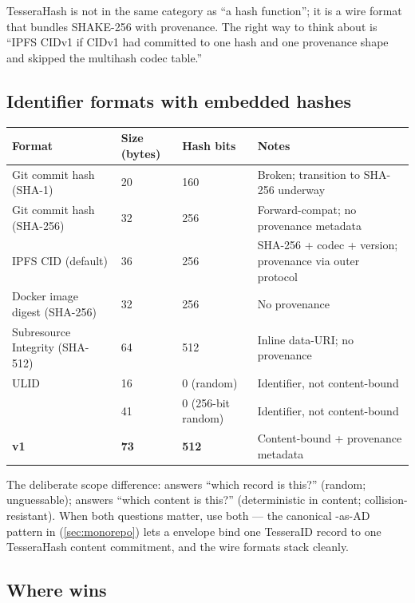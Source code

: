 TesseraHash is not in the same category as ``a hash function''; it is a wire format that bundles SHAKE-256 with provenance. The right way to think about \tesserahash{} is ``IPFS CIDv1 if CIDv1 had committed to one hash and one provenance shape and skipped the multihash codec table.''

\subsection{Identifier formats with embedded hashes}

\begin{center}
\small
\begin{tabularx}{\textwidth}{@{}lllX@{}}
\toprule
\textbf{Format} & \textbf{Size (bytes)} & \textbf{Hash bits} & \textbf{Notes} \\
\midrule
Git commit hash (SHA-1)         & 20 & 160 & Broken; transition to SHA-256 underway \\
Git commit hash (SHA-256)       & 32 & 256 & Forward-compat; no provenance metadata \\
IPFS CID (default)              & 36 & 256 & SHA-256 + codec + version; provenance via outer protocol \\
Docker image digest (SHA-256)   & 32 & 256 & No provenance \\
Subresource Integrity (SHA-512) & 64 & 512 & Inline data-URI; no provenance \\
ULID \citep{ulid}               & 16 & 0 (random) & Identifier, not content-bound \\
\tesseraid{}                          & 41 & 0 (256-bit random) & Identifier, not content-bound \\
\textbf{\tesserahash{} v1}           & \textbf{73} & \textbf{512} & Content-bound + provenance metadata \\
\bottomrule
\end{tabularx}
\end{center}

The deliberate scope difference: \tesseraid{} answers ``which record is this?'' (random; unguessable); \tesserahash{} answers ``which content is this?'' (deterministic in content; collision-resistant). When both questions matter, use both --- the canonical \tesseraid{}-as-AD pattern in \tesseraseal{} (\cref{sec:monorepo}) lets a \tesseraseal{} envelope bind one TesseraID record to one TesseraHash content commitment, and the wire formats stack cleanly.

\subsection{Where \tesserahash{} wins}

